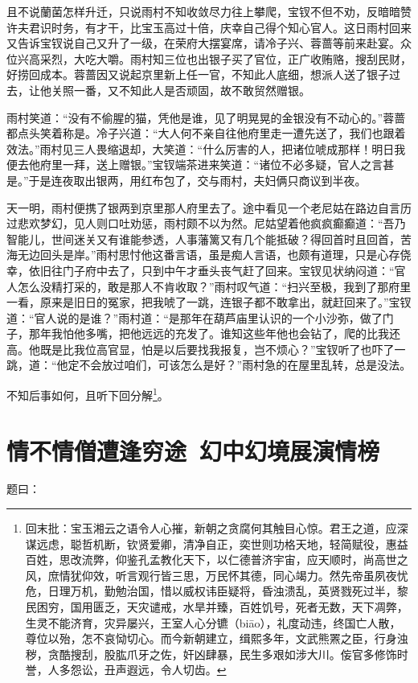 \documentclass[12pt,oneside]{book}
\begin{document}
且不说蘭菌怎样升迁，只说雨村不知收敛尽力往上攀爬，宝钗不但不劝，反暗暗赞许夫君识时务，有才干，比宝玉高过十倍，庆幸自己得个知心官人。这日雨村回来又告诉宝钗说自己又升了一级，在荣府大摆宴席，请冷子兴、蓉蔷等前来赴宴。众位兴高采烈，大吃大嚼。雨村知三位也出银子买了官位，正广收贿赂，搜刮民财，好捞回成本。蓉蔷因又说起京里新上任一官，不知此人底细，想派人送了银子过去，让他关照一番，又不知此人是否顽固，故不敢贸然赠银。

雨村笑道：“没有不偷腥的猫，凭他是谁，见了明晃晃的金银没有不动心的。”蓉蔷都点头笑着称是。冷子兴道：“大人何不亲自往他府里走一遭先送了，我们也跟着效法。”雨村见三人畏缩退却，大笑道：“什么厉害的人，把诸位唬成那样！明日我便去他府里一拜，送上赠银。”宝钗端茶进来笑道：“诸位不必多疑，官人之言甚是。”于是连夜取出银两，用红布包了，交与雨村，夫妇俩只商议到半夜。

天一明，雨村便携了银两到京里那人府里去了。途中看见一个老尼姑在路边自言历过悲欢梦幻，见人则口吐劝惩，雨村颇不以为然。尼姑望着他疯疯癫癫道：“吾乃智能儿，世间迷关又有谁能参透，人事藩篱又有几个能抵破？得回首时且回首，苦海无边回头是岸。”雨村思忖他这番言语，虽是痴人言语，也颇有道理，只是心存侥幸，依旧往门子府中去了，只到中午才垂头丧气赶了回来。宝钗见状纳闷道：“官人怎么没精打采的，敢是那人不肯收取？”雨村叹气道：“扫兴至极，我到了那府里一看，原来是旧日的冤家，把我唬了一跳，连银子都不敢拿出，就赶回来了。”宝钗道：“官人说的是谁？”雨村道：“是那年在葫芦庙里认识的一个小沙弥，做了门子，那年我怕他多嘴，把他远远的充发了。谁知这些年他也会钻了，爬的比我还高。他既是比我位高官显，怕是以后要找我报复，岂不烦心？”宝钗听了也吓了一跳，道：“他定不会放过咱们，可该怎么是好？”雨村急的在屋里乱转，总是没法。

不知后事如何，且听下回分解\footnote{回末批：宝玉湘云之语令人心摧，新朝之贪腐何其触目心惊。君王之道，应深谋远虑，聪哲机断，钦贤爱卿，清净自正，奕世则功格天地，轻简赋役，惠益百姓，思改流弊，仰鉴孔孟教化天下，以仁德普济宇宙，应天顺时，尚高世之风，庶情犹仰效，听言观行皆三思，万民怀其德，同心竭力。然先帝虽夙夜忧危，日理万机，勤勉治国，惜以威权讳臣疑将，昏浊溃乱，英贤戮死过半，黎民困穷，国用匮乏，天灾谴戒，水旱并臻，百姓饥号，死者无数，天下凋弊，生灵不能济育，灾异屡兴，王室人心分镳（biāo），礼度动违，终国亡人散，尊位以殆，怎不哀恸切心。而今新朝建立，缉熙多年，文武熊罴之臣，行身浊秽，贪酷搜刮，股肱爪牙之佐，奸凶肆暴，民生多艰如涉大川。侫官多修饰时誉，人多怨讼，丑声遐远，令人切齿。}。

 
\chapter{情不情僧遭逢穷途~幻中幻境展演情榜}
题曰：
\end{document}
